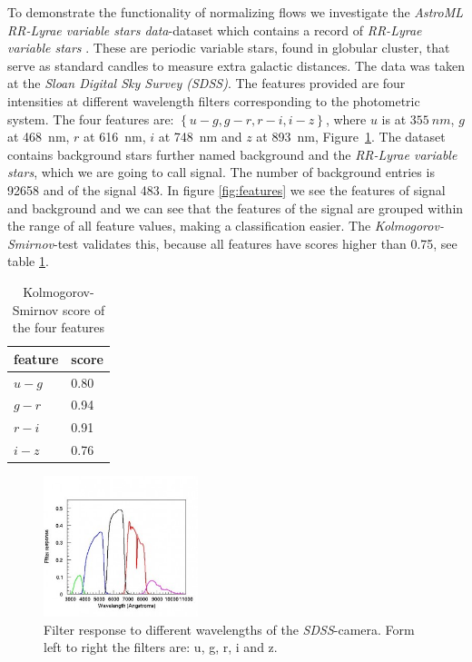 \documentclass[%
 reprint,
 amsmath,amssymb,
 aps,
]{revtex4-2}
\begin{document}
To demonstrate the functionality of normalizing flows we investigate the \textit{AstroML RR-Lyrae variable stars data}-dataset \cite{astroML} which contains a record of \textit{RR-Lyrae variable stars} \cite{Sesar_2009}. These are periodic variable stars, found in globular cluster, that serve as standard candles to measure extra galactic distances. The data was taken at the \textit{Sloan Digital Sky Survey (SDSS)}.
 The features provided are four intensities at different wavelength filters corresponding to the photometric system. The four features are: $\left\{u-g, g-r, r-i, i-z\right\}$, where $u$ is at $\SI{355}{nm}$, $g$ at \SI{468}{nm}, $r$ at \SI{616}{nm}, $i$ at \SI{748}{nm} and $z$ at \SI{893}{nm}, Figure~\ref{fig:filterResp}. The dataset contains background stars further named background and the \textit{RR-Lyrae variable stars}, which we are going to call signal. The number of background entries is \SI{92658}{} and of the signal \SI{483}{}.
 In figure \ref{fig:features} we see the features of signal and background and we can see that the features of the signal are grouped within the range of all feature values, making a classification easier. The \textit{Kolmogorov-Smirnov}-test validates this, because all features have scores higher than 0.75, see table \ref{tab:kolmogorov}.
 
 \begin{table}
 	\centering
 	\begin{tabular}{|l|l|}
 		\hline
		feature & score\\
		\hline
		$u-g$& 0.80\\
		$g-r$& 0.94\\
		$r-i$& 0.91\\
		$i-z$& 0.76\\
		\hline
 	\end{tabular}
 	\caption{Kolmogorov-Smirnov score of the four features \label{tab:kolmogorov}}
 \end{table}
 
 
 \begin{figure}[]
 	\centering
 	\includegraphics[width=0.4\textwidth]{figs/camera_filters-300x274.jpg}
 	\caption{ Filter response to different wavelengths of the \textit{SDSS}-camera. Form left to right the filters are: u, g, r, i and z. \cite{rgbSpec}
 		\label{fig:filterResp}
 	}
 \end{figure}
 
\end{document}

